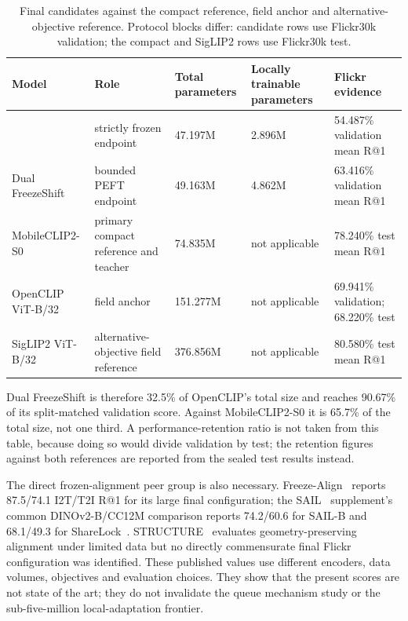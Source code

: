 \begin{table}[htbp]
\centering
\caption{Final candidates against the compact reference, field anchor and alternative-objective reference. Protocol blocks differ: candidate rows use Flickr30k validation; the compact and SigLIP2 rows use Flickr30k test.}
\label{tab:references}
\small
\begin{tabular}{L{2.1cm}L{2.9cm}R{1.9cm}R{2.3cm}L{3.3cm}}
\toprule
Model & Role & Total parameters & Locally trainable parameters & Flickr evidence \\
\midrule
\MTone{} & strictly frozen endpoint & 47.197M & 2.896M & 54.487\% validation mean R@1 \\
Dual FreezeShift & bounded PEFT endpoint & 49.163M & 4.862M & 63.416\% validation mean R@1 \\
MobileCLIP2-S0 & primary compact reference and teacher & 74.835M & not applicable & 78.240\% test mean R@1 \\
OpenCLIP ViT-B/32 & field anchor & 151.277M & not applicable & 69.941\% validation; 68.220\% test \\
SigLIP2 ViT-B/32 & alternative-objective field reference & 376.856M & not applicable & 80.580\% test mean R@1 \\
\bottomrule
\end{tabular}
\end{table}
Dual FreezeShift is therefore 32.5\% of OpenCLIP's total size and reaches 90.67\% of its split-matched validation score. Against MobileCLIP2-S0 it is 65.7\% of the total size, not one third. A performance-retention ratio is not taken from this table, because doing so would divide validation by test; the retention figures against both references are reported from the sealed test results instead.

The direct frozen-alignment peer group is also necessary. Freeze-Align~\cite{maniparambil2025freezealign} reports 87.5/74.1 I2T/T2I R@1 for its large final configuration; the SAIL~\cite{zhang2025sail} supplement's common DINOv2-B/CC12M comparison reports 74.2/60.6 for SAIL-B and 68.1/49.3 for ShareLock~\cite{ruthardt2026sharelock}. STRUCTURE~\cite{groger2025structure} evaluates geometry-preserving alignment under limited data but no directly commensurate final Flickr configuration was identified. These published values use different encoders, data volumes, objectives and evaluation choices. They show that the present scores are not state of the art; they do not invalidate the queue mechanism study or the sub-five-million local-adaptation frontier.

